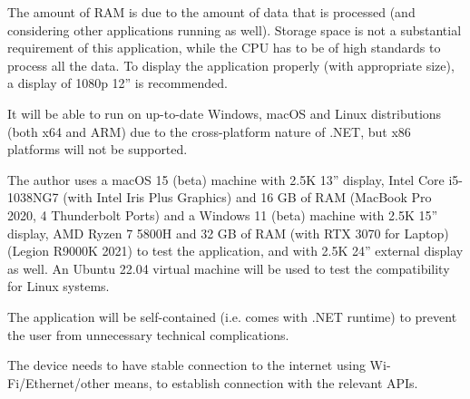 The amount of RAM is due to the amount of data that is processed (and considering other applications running as well). Storage space is not a substantial requirement of this application, while the CPU has to be of high standards to process all the data. To display the application properly (with appropriate size), a display of 1080p 12'' is recommended.

It will be able to run on up-to-date Windows, macOS and Linux distributions (both x64 and ARM) due to the cross-platform nature of .NET, but x86 platforms will not be supported.

The author uses a macOS 15 (beta) machine with 2.5K 13'' display, Intel Core i5-1038NG7 (with Intel Iris Plus Graphics) and 16 GB of RAM (MacBook Pro 2020, 4 Thunderbolt Ports) and a Windows 11 (beta) machine with 2.5K 15'' display, AMD Ryzen 7 5800H and 32 GB of RAM (with RTX 3070 for Laptop) (Legion R9000K 2021) to test the application, and with 2.5K 24'' external display as well. An Ubuntu 22.04 virtual machine will be used to test the compatibility for Linux systems.

The application will be self-contained (i.e. comes with .NET runtime) to prevent the user from unnecessary technical complications.

The device needs to have stable connection to the internet using Wi-Fi/Ethernet/other means, to establish connection with the relevant APIs.